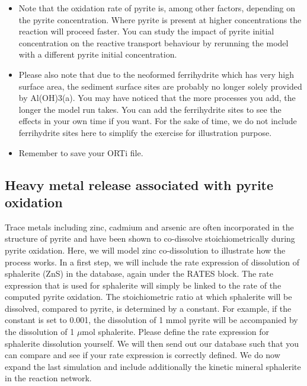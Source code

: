 \begin{itemize}
\item Note that the oxidation rate of pyrite is, among other factors, depending on the pyrite concentration. Where pyrite is present at higher concentrations the reaction will proceed faster. You can study the impact of pyrite initial concentration on the reactive transport behaviour by rerunning the model with a different pyrite initial concentration.

\item Please also note that due to the neoformed ferrihydrite which has very high surface area, the sediment surface sites are probably no longer solely provided by Al(OH)3(a). You may have noticed that the more processes you add, the longer the model run takes. You can add the ferrihydrite sites to see the effects in your own time if you want. For the sake of time, we do not include ferrihydrite sites here to simplify the exercise for illustration purpose. 

\item Remember to save your ORTi file.

\end{itemize}

\subsection[Heavy metal release associated with pyrite oxidation]{Heavy metal release associated with pyrite oxidation}

Trace metals including zinc, cadmium and arsenic are often incorporated 
in the structure of pyrite and have been shown to co-dissolve stoichiometrically 
during pyrite oxidation. Here, we will model zinc co-dissolution 
to illustrate how the process works. 
In a first step, we will include the rate expression of 
dissolution of sphalerite (ZnS) in the database, 
again under the {\color{blue}RATES} block. 
The rate expression that is used for sphalerite will simply be linked 
to the rate of the computed pyrite oxidation. The stoichiometric ratio 
at which sphalerite will be dissolved, compared to pyrite, 
is determined by a constant. For example, if the constant is set to 0.001, 
the dissolution of 1 mmol pyrite will be accompanied by the dissolution 
of 1 $\mu$mol sphalerite. Please define the rate expression for sphalerite 
dissolution yourself. 
We will then send out our database such that you can compare and see if 
your rate expression is correctly defined.
We do now expand the last simulation and include additionally 
the kinetic mineral sphalerite in the reaction network.

